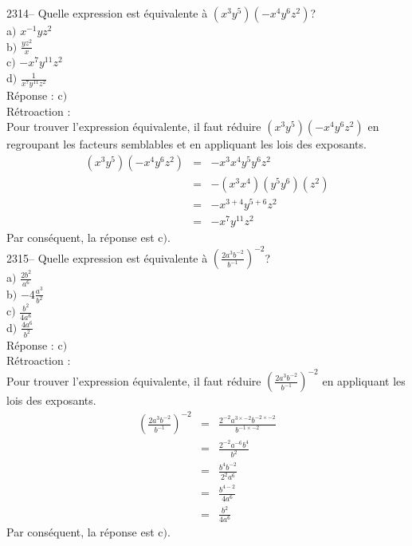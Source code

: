 \documentclass[letterpaper, 12pt]{article}
\begin{document}
2314-- Quelle expression est \'equivalente \`a $\left( x^{3}y^{5}\right) \left( -x^{4}y^{6}z^{2}\right)$?\\

a$)$  $x^{-1}yz^{2}$\\[2mm]
b$)$  $\frac{yz^{2}}{x}$\\[2mm]
c$)$  $-x^{7}y^{11}z^{2}$\\[2mm]
d$)$  $\frac{1}{x^{7}y^{11}z^{2}}$\\

R\'eponse : c$)$\\

R\'etroaction :\\
Pour trouver l'expression \'equivalente, il faut r\'eduire $\left( x^{3}y^{5}\right) \left( -x^{4}y^{6}z^{2}\right)$ en regroupant les facteurs semblables et en appliquant les lois des exposants.
\begin{eqnarray*}
 \left( x^{3}y^{5}\right) \left( -x^{4}y^{6}z^{2}\right) &=& -x^{3}x^{4}y^{5}y^{6}z^{2}\\
&=& -(x^{3}x^{4})(y^{5}y^{6})(z^{2})\\
&=& -x^{3+4}y^{5+6}z^{2}\\
&=& -x^{7}y^{11}z^{2}
\end{eqnarray*}
Par cons\'equent, la r\'eponse est c$)$.\\

2315-- Quelle expression est \'equivalente \`a $ \left( \frac{2a^{3}b^{-2}}{b^{-1}}\right) ^{-2}$?\\

a$)$  $\frac{2b^{2}}{a^{6}}$\\[2mm]
b$)$  $-4\frac{a^{3}}{b^{2}}$\\[2mm]
c$)$  $\frac{b^{2}}{4a^{6}}$\\[2mm]
d$)$  $\frac{4a^{6}}{b^{2}}$\\

R\'eponse : c$)$\\

R\'etroaction :\\
Pour trouver l'expression \'equivalente, il faut r\'eduire $ \left( \frac{2a^{3}b^{-2}}{b^{-1}}\right) ^{-2}$ en appliquant les lois des exposants.
\begin{eqnarray*}
 \left( \frac{2a^{3}b^{-2}}{b^{-1}}\right) ^{-2} &=&  \frac{2^{-2}a^{3\times-2}b^{-2\times-2}}{b^{-1\times-2}}\\[2mm]
&=&  \frac{2^{-2}a^{-6}b^{4}}{b^{2}}\\[2mm]
&=&  \frac{b^{4}b^{-2}}{2^{2}a^{6}}\\[2mm]
&=&  \frac{b^{4-2}}{4a^{6}}\\[2mm]
&=&  \frac{b^{2}}{4a^{6}}
\end{eqnarray*}
Par cons\'equent, la r\'eponse est c$)$.\\
\end{document}
